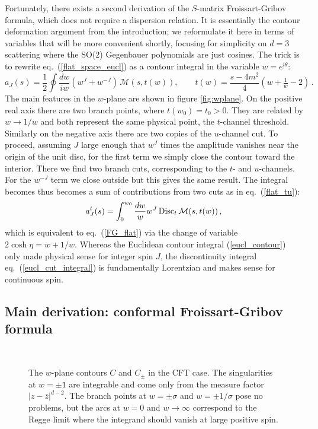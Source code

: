\documentclass[11pt, reqno,preprint]{article}
\def\be{\begin{equation}}
\def\ee{\end{equation}}
\def\zbar{\bar{z}}
\def\j{J}
\begin{document}
Fortunately, there exists a second derivation of the $S$-matrix Froissart-Gribov formula, which does not require a dispersion relation.
It is essentially the contour deformation argument from the introduction;
we reformulate it here in terms of variables that will be more convenient shortly,
focusing for simplicity on $d=3$ scattering where the SO(2) Gegenbauer polynomials are just cosines.
The trick is to rewrite eq.~(\ref{flat_space_eucl}) as a contour integral in the variable $w=e^{i\theta}$:
\be
 a_\j(s) = \frac12\oint \frac{dw}{iw} \left(w^\j+w^{-\j}\right)\,\mathcal{M}(s,t(w)),\qquad t(w)= \frac{s-4m^2}{4}\left(w+\tfrac{1}{w}-2\right)\,. \label{eucl_contour}
\ee
The main features in the $w$-plane are shown in figure \ref{fig:wplane}.
On the positive real axis there are two branch points, where $t(w_0)=t_0>0$.
They are related by $w\to 1/w$ and both represent the same physical point, the $t$-channel threshold.
Similarly on the negative axis there are two copies of the $u$-channel cut.
To proceed, assuming $\j$ large enough that $w^\j$ times the amplitude vanishes near the origin of the unit disc,
for the first term we simply close the contour toward the interior.  There we find two branch cuts, corresponding to the $t$- and $u$-channels.
For the $w^{-\j}$ term we close outside but this gives the same result.
The integral becomes thus becomes a sum of contributions
from two cuts as in eq.~(\ref{flat_tu}):
\be
 a_\j^t(s) = \int_0^{w_0} \frac{dw}{w}w^\j\, {\rm Disc}_t\,\mathcal{M}(s,t(w))\,, \label{eucl_cut_integral}
\ee
which is equivalent to eq.~(\ref{FG_flat}) via the change of variable $2\cosh\eta=w+1/w$.
Whereas the Euclidean contour integral (\ref{eucl_contour}) only made physical sense for integer spin $\j$,
the discontinuity integral eq.~(\ref{eucl_cut_integral}) is fundamentally Lorentzian and makes sense for continuous
spin.

\subsection{Main derivation: conformal Froissart-Gribov formula}

\begin{figure}
\be\begin{array}{cc}
\def\svgwidth{65mm}
&\hspace{10mm}
\def\svgwidth{65mm}
\end{array}\nonumber\ee
\caption{The $w$-plane contours $C$ and $C_\pm$ in the CFT case.  The singularities at $w=\pm 1$ are integrable and come
only from the measure factor $|z-\zbar|^{d-2}$.  The branch points at $w=\pm\sigma$ and $w=\pm1/\sigma$ pose no problems,
but the arcs at $w=0$ and $w\to\infty$ correspond to the Regge limit where the integrand should vanish at large positive spin.
}
\label{fig:wplane2}
\end{figure}
\end{document}
